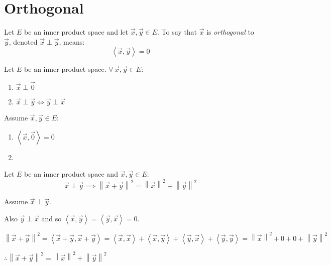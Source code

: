 \documentclass[letterpaper,12pt,fleqn]{article}
\newcommand{\vx}{\vec{x}}
\newcommand{\vy}{\vec{y}}
\newcommand{\vo}{\vec{0}}
\newcommand{\norm}[1]{\left\|#1\right\|}
\newcommand{\inner}[2]{\left<#1,#2\right>}
\newcommand{\conj}[1]{\overline{#1}}
\begin{document}
\section*{Orthogonal}

\begin{definition}[Orthogonal]
  Let $E$ be an inner product space and let $\vx,\vy\in E$. To say that $\vx$
  is \emph{orthogonal} to $\vy$, denoted $\vx\perp\vy$, means:
  \[\inner{\vx}{\vy}=0\]
\end{definition}

\begin{properties}
  Let $E$ be an inner product space. $\forall\,\vx,\vy\in E$:
  \begin{enumerate}
  \item $\vx\perp\vo$
  \item $\vx\perp\vy\iff\vy\perp\vx$
  \end{enumerate}
\end{properties}

\begin{theproof}
  Assume $\vx,\vy\in E$:
  \begin{enumerate}
  \item $\inner{\vx}{\vo}=0$

  \item
  \end{enumerate}
\end{theproof}

\begin{theorem}[Pythagorean]
  Let $E$ be an inner product space and $\vx,\vy\in E$:
  \[\vx\perp\vy\implies\norm{\vx+\vy}^2=\norm{\vx}^2+\norm{\vy}^2\]
\end{theorem}

\begin{theproof}
  Assume $\vx\perp\vy$.

  Also $\vy\perp\vx$ and so $\inner{\vx}{\vy}=\inner{\vy}{\vx}=0$.
    
  $\norm{\vx+\vy}^2=\inner{\vx+\vy}{\vx+\vy}=
  \inner{\vx}{\vx}+\inner{\vx}{\vy}+\inner{\vy}{\vx}+\inner{\vy}{\vy}=
  \norm{\vx}^2+0+0+\norm{\vy}^2$

  $\therefore\norm{\vx+\vy}^2=\norm{\vx}^2+\norm{\vy}^2$
\end{theproof}
\end{document}
